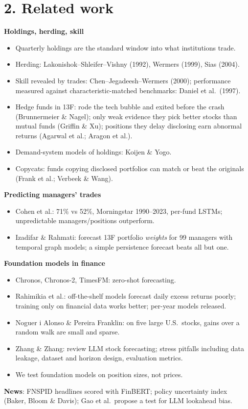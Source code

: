 \documentclass[11pt]{article}
\begin{document}
\section*{2. Related work}
\textbf{Holdings, herding, skill}
\begin{itemize}
  \item Quarterly holdings are the standard window into what institutions trade.
  \item Herding: Lakonishok--Shleifer--Vishny (1992), Wermers (1999), Sias (2004).
  \item Skill revealed by trades: Chen--Jegadeesh--Wermers (2000); performance
  measured against characteristic-matched benchmarks: Daniel et al.\ (1997).
  \item Hedge funds in 13F: rode the tech bubble and exited before the crash
  (Brunnermeier \& Nagel); only weak evidence they pick better stocks than mutual
  funds (Griffin \& Xu); positions they delay disclosing earn abnormal returns
  (Agarwal et al.; Aragon et al.).
  \item Demand-system models of holdings: Koijen \& Yogo.
  \item Copycats: funds copying disclosed portfolios can match or beat the
  originals (Frank et al.; Verbeek \& Wang).
\end{itemize}
\textbf{Predicting managers' trades}
\begin{itemize}
  \item Cohen et al.: 71\% vs 52\%, Morningstar 1990--2023, per-fund LSTMs;
  unpredictable managers/positions outperform.
  \item Izadifar \& Rahmati: forecast 13F portfolio \emph{weights} for 99 managers
  with temporal graph models; a simple persistence forecast beats all but one.
\end{itemize}
\textbf{Foundation models in finance}
\begin{itemize}
  \item Chronos, Chronos-2, TimesFM: zero-shot forecasting.
  \item Rahimikia et al.: off-the-shelf models forecast daily excess returns
  poorly; training only on financial data works better; per-year models released.
  \item Noguer i Alonso \& Pereira Franklin: on five large U.S.\ stocks, gains over
  a random walk are small and sparse.
  \item Zhang \& Zhang: review LLM stock forecasting; stress pitfalls including data
  leakage, dataset and horizon design, evaluation metrics.
  \item We test foundation models on position sizes, not prices.
\end{itemize}
\textbf{News}: FNSPID headlines scored with FinBERT; policy uncertainty index
(Baker, Bloom \& Davis); Gao et al.\ propose a test for LLM lookahead bias.
\end{document}
